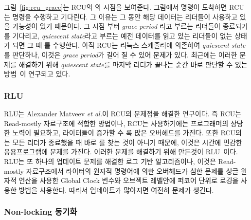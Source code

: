 그림~\ref{fig:rcu_grace}는 RCU의 의 시점을 보여준다.
그림에서  명령이 도착하면  RCU는  명령을 수행하고 기다린다.  
그 이유는 그 동안 해당 데이터는 리더들이 사용하고 있을 가능성이 있기 때문이다.
그 시점 부터 \textit{grace period} 라고 부르는 리더들이 종료되기를 기다리고, \textit{quiescent
state}라고 부르는 예전 데이터를 읽고 있는 리더들이 없는 상태가 되면 그 때 를 수행한다. 
아직 RCU는 리눅스 스케줄러에 의존하여 \textit{quiescent state}를 판단하나, 
이것은 \textit{grace period}가 길어 질 수 있어 문제가 있다. 
최근에는 이러한 문제를 해결하기 위해 \textit{quiescent state}를 마지막 리더가 끝나는 순간 바로 판단할 
수 있는 방법~\cite{Arbel2015PRR}이 연구되고 있다.

\subsubsection{RLU}

RLU는 Alexander Matveev \textit{et al.}이 RCU의 문제점을 해결한 연구이다. 
즉 RCU는 Read-mostly 자료구조에 적합한 방법이나, RCU는 사용하기에는 프로그래머의 상당한 노력이 
필요하고, 라이터들이 증가할 수 록 많은 오버헤드를 가진다.
또한 RCU의 는 모든 리더가 종료했을 때 바로 를 찾는 것이 아니기
때문에, 이것은 시간에 민감한 응용프로그램에 문제를 가진다. 
이러한 문제를 해결하기 위해 만든것이 RLU~\cite{Matveev2015RLU}이다. 
RLU는 또 하나의 업데이트 문제를 해결한 로그 기반 알고리즘이나, 
이것은 Read-mostly 자료구조에서 라이터의 원자적 명령어에 의한 오버헤드가 심한 문제를 
싱글 원자적 연산을 사용한 Global Clock 변수와 오브젝트 레벨안에 퍼코어 단위로 로깅을 사용한 방법을 사용한다.
따라서 업데이트가 많아지면 여전히 문제가 생긴다.

\subsubsection{Non-locking 동기화}


